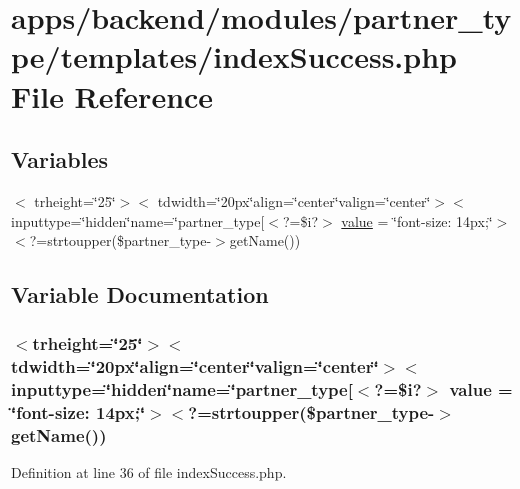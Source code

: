 \hypertarget{backend_2modules_2partner__type_2templates_2index_success_8php}{\section{apps/backend/modules/partner\-\_\-type/templates/index\-Success.php File Reference}
\label{backend_2modules_2partner__type_2templates_2index_success_8php}
}
\subsection*{Variables}
\begin{DoxyCompactItemize}
\item 
$<$ trheight=\char`\"{}25\char`\"{}$>$$<$ tdwidth=\char`\"{}20px\char`\"{}align=\char`\"{}center\char`\"{}valign=\char`\"{}center\char`\"{}$>$$<$ inputtype=\char`\"{}hidden\char`\"{}name=\char`\"{}partner\-\_\-type\mbox{[}$<$?=\$i?$>$ \hyperlink{backend_2modules_2partner__type_2templates_2index_success_8php_a2ab884068a6dad77ae83a5a97e4fddee}{value} = \char`\"{}font-\/size\-: 14px;\char`\"{}$>$$<$?=strtoupper(\$partner\-\_\-type-\/$>$get\-Name())
\end{DoxyCompactItemize}


\subsection{Variable Documentation}
\hypertarget{backend_2modules_2partner__type_2templates_2index_success_8php_a2ab884068a6dad77ae83a5a97e4fddee}{
\subsubsection[{value}]{\setlength{\rightskip}{0pt plus 5cm}$<$trheight=\char`\"{}25\char`\"{}$>$$<$tdwidth=\char`\"{}20px\char`\"{}align=\char`\"{}center\char`\"{}valign=\char`\"{}center\char`\"{}$>$$<$inputtype=\char`\"{}hidden\char`\"{}name=\char`\"{}partner\-\_\-type\mbox{[}$<$?=\$i?$>$ value = \char`\"{}font-\/size\-: 14px;\char`\"{}$>$$<$?=strtoupper(\$partner\-\_\-type-\/$>$get\-Name())}}\label{backend_2modules_2partner__type_2templates_2index_success_8php_a2ab884068a6dad77ae83a5a97e4fddee}


Definition at line 36 of file index\-Success.\-php.

